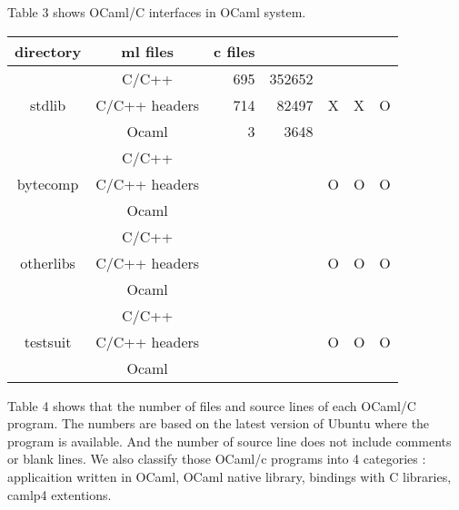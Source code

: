 \documentclass[11pt,a4paper]{article}
\begin{document}
Table 3 shows OCaml/C interfaces in OCaml system.



\begin{table}[h,t] 
\begin{tabular}{| c|c|r|r| c| c|c|}
 \hline

 \multirow{1}{*}{directory} & ml files & c files &&&&\\
 \hline


 \multirow{3}{*}{stdlib} & C/C++ & 695 & 352652 & \multirow{3}{*}{X} & \multirow{3}{*}{X} & \multirow{3}{*}{O}\\
 \cline{3-5}
  &                           C/C++ headers & 714 & 82497 & & & \\
 \cline{3-5}
  &                          Ocaml & 3 & 3648 & & & \\
 \hline



  \multirow{3}{*}{bytecomp} & C/C++ &  &  & \multirow{3}{*}{O} & \multirow{3}{*}{O} & \multirow{3}{*}{O}\\
 \cline{3-5}
  &                           C/C++ headers &  &  & & & \\
 \cline{3-5}
  &                          Ocaml &  &  & & & \\
 \hline


  \multirow{3}{*}{otherlibs} & C/C++ &  &  & \multirow{3}{*}{O} & \multirow{3}{*}{O} & \multirow{3}{*}{O}\\
 \cline{3-5}
  &                           C/C++ headers &  &  & & & \\
 \cline{3-5}
  &                          Ocaml &  &  & & & \\
 \hline

  \multirow{3}{*}{testsuit} & C/C++ &  &  & \multirow{3}{*}{O} & \multirow{3}{*}{O} & \multirow{3}{*}{O}\\
 \cline{3-5}
  &                           C/C++ headers &  &  & & & \\
 \cline{3-5}
  &                          Ocaml &  &  & & & \\
 \hline




 

 
\end{tabular}
\end{table}





Table 4 shows that the number of files and source lines of each OCaml/C program. The numbers are based on the latest
version of Ubuntu where the program is available. And the number of source line does not include comments or blank lines.
We also classify those OCaml/c programs into 4 categories : applicaition written in OCaml, OCaml native library, bindings with C libraries, camlp4 extentions. 
\end{document}
